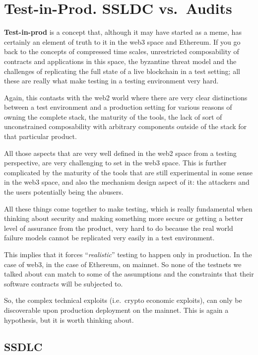 \section{Test-in-Prod. SSLDC
vs.~Audits}\label{test-in-prod.-ssldc-vs.-audits}

\textbf{Test-in-prod} is a concept that, although it may have started as
a meme, has certainly an element of truth to it in the web3 space and
Ethereum. If you go back to the concepts of compressed time scales,
unrestricted composability of contracts and applications in this space,
the byzantine threat model and the challenges of replicating the full
state of a live blockchain in a test setting; all these are really what
make testing in a testing environment very hard.

Again, this contasts with the web2 world where there are very clear
distinctions between a test environment and a production setting for
various reasons of owning the complete stack, the maturity of the tools,
the lack of sort of unconstrained composability with arbitrary
components outside of the stack for that particular product.

All those aspects that are very well defined in the web2 space from a
testing perspective, are very challenging to set in the web3 space. This
is further complicated by the maturity of the tools that are still
experimental in some sense in the web3 space, and also the mechanism
design aspect of it: the attackers and the users potentially being the
abusers.

All these things come together to make testing, which is really
fundamental when thinking about security and making something more
secure or getting a better level of assurance from the product, very
hard to do because the real world failure models cannot be replicated
very easily in a test environment.

This implies that it forces ``\emph{realistic}'' testing to happen only
in production. In the case of web3, in the case of Ethereum, on mainnet.
So none of the testnets we talked about can match to some of the
assumptions and the constraints that their software contracts will be
subjected to.

So, the complex technical exploits (i.e.~crypto economic exploits), can
only be discoverable upon production deployment on the mainnet. This is
again a hypothesis, but it is worth thinking about.

\subsection{SSDLC}\label{ssdlc}

